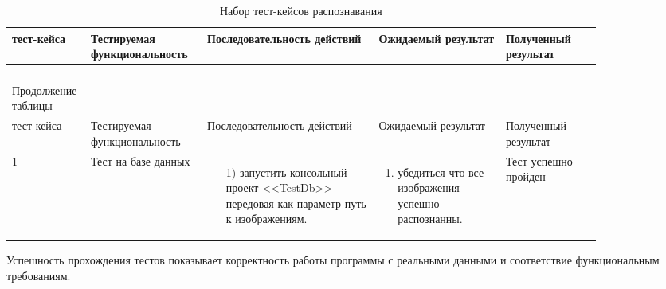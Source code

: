\begin{longtable}{| >{\raggedright}m{0.06\linewidth} 
                  | >{\raggedright}m{0.18\linewidth} 
                  | >{\raggedright}m{0.27\linewidth} 
                  | >{\raggedright}m{0.2\linewidth} 
                  | >{\raggedright\arraybackslash}m{0.15\linewidth}|}
	\caption{Набор тест-кейсов распознавания}
	\label{table:testing:dashboard_constructing} \\

   \hline
   \No{} тест-кейса & Тестируемая функциональность & Последовательность действий & Ожидаемый результат & Полученный результат\\
   \endfirsthead

	\multicolumn{3}{c}%
	{{ \raggedleft \tablename\ \thetable{} -- Продолжение таблицы}} \\

	\hline
   	\No{} тест-кейса & Тестируемая функциональность & Последовательность действий & Ожидаемый результат & Полученный результат\\

	\hline 
	\endhead

	\hline
	1 & Тест на базе данных & 
   			\begin{enumerate}
				\item[1)] запустить консольный проект <<TestDb>> передовая как параметр путь к изображениям.
			\end{enumerate}
   			& 
   			\begin{enumerate}
   				\item убедиться что все изображения успешно распознанны.
   			\end{enumerate}
   			& Тест успешно пройден \\
	\hline
\end{longtable}

Успешность прохождения тестов показывает корректность работы программы с реальными данными и соответствие функциональным требованиям.
